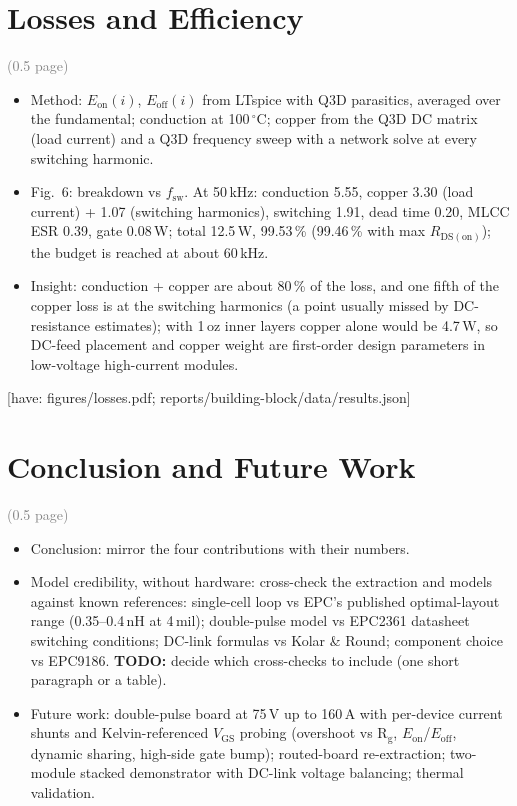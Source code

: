 \documentclass[conference]{IEEEtran}
\newcommand{\todo}[1]{\textcolor{red!70!black}{\textbf{TODO:} #1}}
\newcommand{\have}[1]{\textcolor{green!40!black}{\small[have: #1]}}
\newcommand{\pages}[1]{\hfill\textcolor{gray}{\small(#1 page)}}
\begin{document}
\section{Losses and Efficiency}\pages{0.5}
\begin{itemize}
\item Method: $E_\mathrm{on}(i)$, $E_\mathrm{off}(i)$ from LTspice with Q3D parasitics, averaged over the fundamental; conduction at 100\,$^\circ$C; copper from the Q3D DC matrix (load current) and a Q3D frequency sweep with a network solve at every switching harmonic.
\item Fig.~6: breakdown vs $f_\mathrm{sw}$. At 50\,kHz: conduction 5.55, copper 3.30 (load current) + 1.07 (switching harmonics), switching 1.91, dead time 0.20, MLCC ESR 0.39, gate 0.08\,W; total 12.5\,W, 99.53\,\% (99.46\,\% with max $R_\mathrm{DS(on)}$); the budget is reached at about 60\,kHz.
\item Insight: conduction + copper are about 80\,\% of the loss, and one fifth of the copper loss is at the switching harmonics (a point usually missed by DC-resistance estimates); with 1\,oz inner layers copper alone would be 4.7\,W, so DC-feed placement and copper weight are first-order design parameters in low-voltage high-current modules.
\end{itemize}
\have{figures/losses.pdf; reports/building-block/data/results.json}

\section{Conclusion and Future Work}\pages{0.5}
\begin{itemize}
\item Conclusion: mirror the four contributions with their numbers.
\item Model credibility, without hardware: cross-check the extraction and models against known references:
 single-cell loop vs EPC's published optimal-layout range (0.35--0.4\,nH at 4\,mil);
 double-pulse model vs EPC2361 datasheet switching conditions;
 DC-link formulas vs Kolar \& Round;
 component choice vs EPC9186.
 \todo{decide which cross-checks to include (one short paragraph or a table).}
\item Future work: double-pulse board at 75\,V up to 160\,A with per-device current shunts and Kelvin-referenced $V_\mathrm{GS}$ probing (overshoot vs R$_\mathrm{g}$, $E_\mathrm{on}$/$E_\mathrm{off}$, dynamic sharing, high-side gate bump); routed-board re-extraction; two-module stacked demonstrator with DC-link voltage balancing; thermal validation.
\end{itemize}
\end{document}

